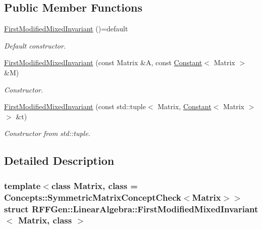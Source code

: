 \subsection*{Public Member Functions}
\begin{DoxyCompactItemize}
\item 
\hypertarget{structRFFGen_1_1LinearAlgebra_1_1FirstModifiedMixedInvariant_a81fca73557d2c6bc0cd773bd9431cb64}{\hyperlink{structRFFGen_1_1LinearAlgebra_1_1FirstModifiedMixedInvariant_a81fca73557d2c6bc0cd773bd9431cb64}{First\-Modified\-Mixed\-Invariant} ()=default}\label{structRFFGen_1_1LinearAlgebra_1_1FirstModifiedMixedInvariant_a81fca73557d2c6bc0cd773bd9431cb64}

\begin{DoxyCompactList}\small\item\em Default constructor. \end{DoxyCompactList}\item 
\hyperlink{structRFFGen_1_1LinearAlgebra_1_1FirstModifiedMixedInvariant_a8b88a33160220e42121a05876a27d480}{First\-Modified\-Mixed\-Invariant} (const Matrix \&A, const \hyperlink{structRFFGen_1_1Constant}{Constant}$<$ Matrix $>$ \&M)
\begin{DoxyCompactList}\small\item\em Constructor. \end{DoxyCompactList}\item 
\hyperlink{structRFFGen_1_1LinearAlgebra_1_1FirstModifiedMixedInvariant_acb5d04a5302a1b2e5b1dc1fafbc8a63f}{First\-Modified\-Mixed\-Invariant} (const std\-::tuple$<$ Matrix, \hyperlink{structRFFGen_1_1Constant}{Constant}$<$ Matrix $>$ $>$ \&t)
\begin{DoxyCompactList}\small\item\em Constructor from std\-::tuple. \end{DoxyCompactList}\end{DoxyCompactItemize}


\subsection{Detailed Description}
\subsubsection*{template$<$class Matrix, class = Concepts\-::\-Symmetric\-Matrix\-Concept\-Check$<$\-Matrix$>$$>$struct R\-F\-F\-Gen\-::\-Linear\-Algebra\-::\-First\-Modified\-Mixed\-Invariant$<$ Matrix, class $>$}

